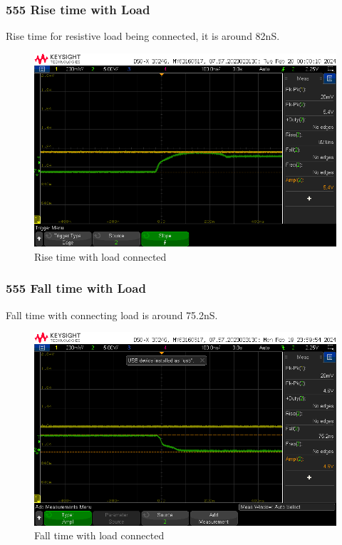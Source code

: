 \documentclass[a4paper,11pt]{article}%
\begin{document}
\subsubsection{555 Rise time with Load}
Rise time for resistive load being connected, it is around 82nS.
\begin{figure}[H]
	\centering
	\includegraphics[scale=0.6]{figures/rise_w_load.png}
	\caption{Rise time with load connected}
\end{figure}

\subsubsection{555 Fall time with Load}
Fall time with connecting load is around 75.2nS.
\begin{figure}[H]
	\centering
	\includegraphics[scale=0.6]{figures/fall_w_load.png}
	\caption{Fall time with load connected}
\end{figure}
\end{document}
